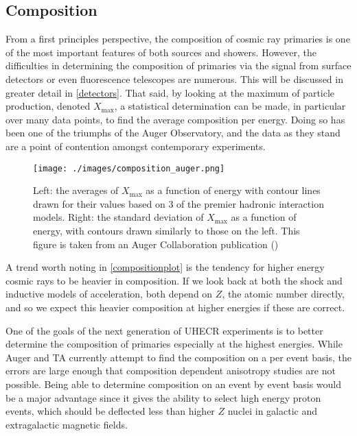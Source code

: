 \subsection{Composition}
\label{composition}
From a first principles perspective, the composition of cosmic ray primaries is one of the most important features of both sources and showers. However, the difficulties in determining the composition of primaries via the signal from surface detectors or even fluorescence telescopes are numerous. This will be discussed in greater detail in \autoref{detectors}. That said, by looking at the maximum of particle production, denoted $X_{\mbox{max}}$, a statistical determination can be made, in particular over many data points, to find the average composition per energy. Doing so has been one of the triumphs of the Auger Observatory, and the data as they stand are a point of contention amongst contemporary experiments. 
\begin{figure}[h!]
\begin{center}
\texttt{[image: ./images/composition\_auger.png]}
\caption[$X_{max}$ per Particle Type Contours]{Left: the averages of $X_{\mbox{max}}$ as a function of energy with contour lines drawn for their values based on 3 of the premier hadronic interaction models. Right: the standard deviation of $X_{\mbox{max}}$ as a function of energy, with contours drawn similarly to those on the left. This figure is taken from an Auger Collaboration publication (\cite{futuregzk})}
\label{compositionplot}
\end{center}
\end{figure}
A trend worth noting in \autoref{compositionplot} is the tendency for higher energy cosmic rays to be heavier in composition. If we look back at both the shock and inductive models of acceleration, both depend on $Z$, the atomic number directly, and so we expect this heavier composition at higher energies if these are correct. 

One of the goals of the next generation of UHECR experiments is to better determine the composition of primaries especially at the highest energies. While Auger and TA currently attempt to find the composition on a per event basis, the errors are large enough that composition dependent anisotropy studies are not possible.  Being able to determine composition on an event by event basis would be a major advantage since it gives the ability to select high energy proton events, which should be deflected less than higher $Z$ nuclei in galactic and extragalactic magnetic fields.

